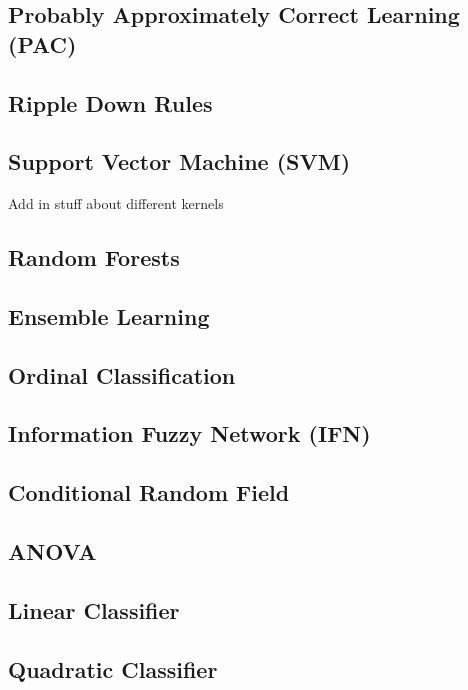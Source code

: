 \documentclass{report}
\begin{document}
	\subsection{Probably Approximately Correct Learning (PAC)}

	\subsection{Ripple Down Rules}
	
	\subsection{Support Vector Machine (SVM)}
		Add in stuff about different kernels

	\subsection{Random Forests}

	\subsection{Ensemble Learning}

	\subsection{Ordinal Classification}

	\subsection{Information Fuzzy Network (IFN)}

	\subsection{Conditional Random Field}

	\subsection{ANOVA}

	\subsection{Linear Classifier}

	\subsection{Quadratic Classifier}
\end{document}
